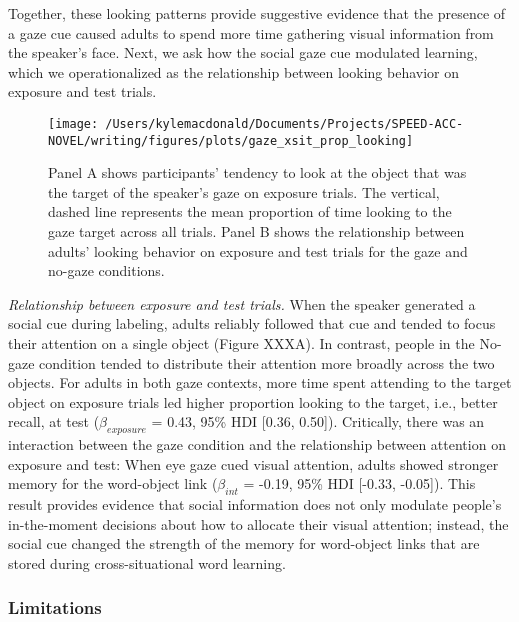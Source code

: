 \documentclass[man,floatsintext]{apa6}
\theoremstyle{definition}
\theoremstyle{definition}
\theoremstyle{definition}
\theoremstyle{remark}
\begin{document}
Together, these looking patterns provide suggestive evidence that the
presence of a gaze cue caused adults to spend more time gathering visual
information from the speaker's face. Next, we ask how the social gaze
cue modulated learning, which we operationalized as the relationship
between looking behavior on exposure and test trials.

\begin{figure}[!t]

{\centering \texttt{[image: /Users/kylemacdonald/Documents/Projects/SPEED-ACC-NOVEL/writing/figures/plots/gaze\_xsit\_prop\_looking]} 

}

\caption{Panel A shows participants’ tendency to look at the object that was the target of the speaker’s gaze on exposure trials. The vertical, dashed line represents the mean proportion of time looking to the gaze target across all trials. Panel B shows the relationship between adults' looking behavior on exposure and test trials for the gaze and no-gaze conditions.}\label{fig:gaze-xsit-prop-looking-plot}
\end{figure}

\emph{Relationship between exposure and test trials.} When the speaker
generated a social cue during labeling, adults reliably followed that
cue and tended to focus their attention on a single object (Figure
XXXA). In contrast, people in the No-gaze condition tended to distribute
their attention more broadly across the two objects. For adults in both
gaze contexts, more time spent attending to the target object on
exposure trials led higher proportion looking to the target, i.e.,
better recall, at test (\(\beta_{exposure}\) = 0.43, 95\% HDI {[}0.36,
0.50{]}). Critically, there was an interaction between the gaze
condition and the relationship between attention on exposure and test:
When eye gaze cued visual attention, adults showed stronger memory for
the word-object link (\(\beta_{int}\) = -0.19, 95\% HDI {[}-0.33,
-0.05{]}). This result provides evidence that social information does
not only modulate people's in-the-moment decisions about how to allocate
their visual attention; instead, the social cue changed the strength of
the memory for word-object links that are stored during
cross-situational word learning.

\subsubsection{Limitations}\label{limitations}
\end{document}

